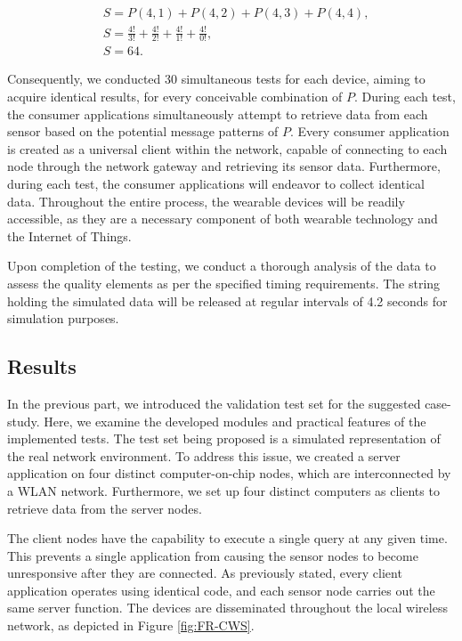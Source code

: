 \begin{align*}
    & S = P(4,1) + P(4,2) + P(4,3) + P(4,4),\\
    & S = \frac{4!}{3!} + \frac{4!}{2!} + \frac{4!}{1!} + \frac{4!}{0!},\\
    & S = 64.
\end{align*}

Consequently, we conducted 30 simultaneous tests for each device, aiming to acquire identical results, for every conceivable combination of $P$. During each test, the consumer applications simultaneously attempt to retrieve data from each sensor based on the potential message patterns of $P$. Every consumer application is created as a universal client within the network, capable of connecting to each node through the network gateway and retrieving its sensor data. Furthermore, during each test, the consumer applications will endeavor to collect identical data. Throughout the entire process, the wearable devices will be readily accessible, as they are a necessary component of both wearable technology and the Internet of Things.

Upon completion of the testing, we conduct a thorough analysis of the data to assess the quality elements as per the specified timing requirements. The string holding the simulated data will be released at regular intervals of 4.2 seconds for simulation purposes.


\subsection{Results}

In the previous part, we introduced the validation test set for the suggested case-study. Here, we examine the developed modules and practical features of the implemented tests. The test set being proposed is a simulated representation of the real network environment. To address this issue, we created a server application on four distinct computer-on-chip nodes, which are interconnected by a WLAN network. Furthermore, we set up four distinct computers as clients to retrieve data from the server nodes. 

The client nodes have the capability to execute a single query at any given time. This prevents a single application from causing the sensor nodes to become unresponsive after they are connected. As previously stated, every client application operates using identical code, and each sensor node carries out the same server function. The devices are disseminated throughout the local wireless network, as depicted in Figure \ref{fig:FR-CWS}.

